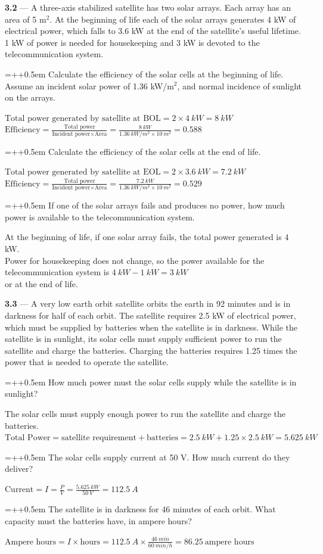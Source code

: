 \documentclass[12pt]{article}
\newcommand{\ans}[1]{\boxed{#1}}
\newlength{\subproblemindent}
\newlength{\subproblemlabelwidth}
\newlength{\solutionindent}
\newcommand{\problem}[2]{\vspace{1em}\noindent\textbf{#1} --- #2\par\vspace{0.25em}}
\newcommand{\subproblem}[2]{%
  \par\vspace{0.25em}%
  \noindent
  \hangindent=\dimexpr\subproblemindent+\subproblemlabelwidth+0.5em\relax
  \hangafter=1
  \hspace*{\subproblemindent}%
  \makebox[\subproblemlabelwidth][l]{\textbf{#1}}#2\par
}
\newcommand{\solution}[1]{%
  \par\vspace{0.0em}%
  \begin{list}{}{
    \setlength{\leftmargin}{\solutionindent}
    \setlength{\rightmargin}{0pt}
    \setlength{\listparindent}{0pt}
    \setlength{\itemindent}{0pt}
    \setlength{\parsep}{0pt}
  }%
    \item\relax
    \begingroup
      \setlength{\baselineskip}{2.0\baselineskip}
      \setlength{\lineskip}{2.0\lineskip}
      \setlength{\parskip}{0pt}
      \everymath{\displaystyle}
      #1
      \par
    \endgroup
  \end{list}%
  \vspace{0.25em}%
}
\begin{document}
\problem{3.2}{A three-axis stabilized satellite has two solar arrays. Each array has an area of 5 m$^2$. At the beginning of life each of the solar arrays generates 4 kW of electrical power,
which falls to 3.6 kW at the end of the satellite's useful lifetime. 1 kW of power is needed for housekeeping and 3 kW is devoted to the telecommunication system.}
\subproblem{a.}{Calculate the efficiency of the solar cells at the beginning of life. Assume an incident solar power of 1.36 kW/m$^2$, and normal incidence of sunlight on the arrays.}
\solution{
  $\text{Total power generated by satellite at BOL} = 2 \times 4\ kW = 8\ kW$ \\
  $\text{Efficiency} = \frac{\text{Total power}}{\text{Incident power} \times \text{Area}} = \frac{8\ kW}{1.36\ kW/m^2 \times 10\ m^2} = \ans{0.588}$
}
\subproblem{b.}{Calculate the efficiency of the solar cells at the end of life.}
\solution{
  $\text{Total power generated by satellite at EOL} = 2 \times 3.6\ kW = 7.2\ kW$ \\
  $\text{Efficiency} = \frac{\text{Total power}}{\text{Incident power} \times \text{Area}} = \frac{7.2\ kW}{1.36\ kW/m^2 \times 10\ m^2} = \ans{0.529}$
}
\subproblem{c.}{If one of the solar arrays fails and produces no power, how much power is available to the telecommunication system.}
\solution{At the beginning of life, if one solar array fails, the total power generated is 4 kW. \\
Power for housekeeping does not change, so the power available for the telecommunication system is $4\ kW - 1\ kW = \ans{3\ kW}$ \\
or \ans{2.6\ kW} at the end of life.}

\problem{3.3}{A very low earth orbit satellite orbits the earth in 92 minutes and is in darkness for half of each orbit. 
The satellite requires 2.5 kW of electrical power, which must be supplied by batteries when the satellite is in darkness. 
While the satellite is in sunlight, its solar cells must supply sufficient power to run the satellite and charge the batteries.
Charging the batteries requires 1.25 times the power that is needed to operate the satellite.}
\subproblem{a.}{How much power must the solar cells supply while the satellite is in sunlight?}
\solution{The solar cells must supply enough power to run the satellite and charge the batteries. \\
$\text{Total Power} = \text{satellite requirement} + \text{batteries} = 2.5\ kW + 1.25 \times 2.5\ kW = \ans{5.625\ kW}$}
\subproblem{b.}{The solar cells supply current at 50 V. How much current do they deliver?}
\solution{$\text{Current} = I = \frac{P}{V} = \frac{5.625\ kW}{50\ V} = \ans{112.5\ A}$}
\subproblem{c.}{The satellite is in darkness for 46 minutes of each orbit. 
What capacity must the batteries have, in ampere hours?}
\solution{$\text{Ampere hours} = I \times \text{hours} = 112.5\ A \times \frac{46\ min}{60\ min/h} = \ans{86.25\ \text{ampere hours}}$}
\end{document}
